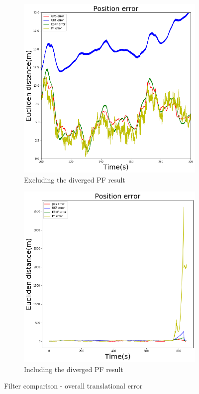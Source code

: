 \begin{figure}[h]
    \begin{subfigure}{0.5\textwidth}
        \centering
        \includegraphics[width=1\textwidth]{figs/overall.png}
        \caption{Excluding the diverged \gls{PF} result}
    \end{subfigure}%
    \begin{subfigure}{0.5\textwidth}
        \includegraphics[width=1\textwidth]{figs/overall_diverge.png}
        \caption{Including the diverged \gls{PF} result}
    \end{subfigure}
    \vspace{-0.5cm}
    \caption{Filter comparison - overall translational error}
    \label{fig:ch:errorPositionOverall}
    \vspace{0.5cm}
\end{figure}



